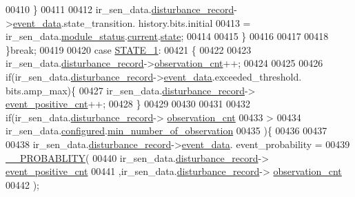 \begin{DoxyCode}
00410              \}
00411 
00412                  ir\_sen\_data.\hyperlink{a00023_ac9b38e2c1d3f1013a88d33506c754152}{disturbance\_record}->\hyperlink{a00028_a8c0bda69e71ef674e60da47ad0be9ab0}{event\_data}.state\_transition.
      history.bits.initial
00413                 = ir\_sen\_data.\hyperlink{a00023_a5a53c391562b059eb744ac679f3765ca}{module\_status}.\hyperlink{a00017_ab8af48cdbba92b3ae39c4470e53af944}{current}.\hyperlink{a00017_a6b8d8e916bc56265a3fd279bd26b6d1b}{state};
00414 
00415             \}
00416 
00417 
00418         \}\textcolor{keywordflow}{break};
00419 
00420          \textcolor{keywordflow}{case} \hyperlink{a00021_a727351838367f27ac0adb9a13422c342}{STATE\_1}:
00421         \{
00422 
00423             ir\_sen\_data.\hyperlink{a00023_ac9b38e2c1d3f1013a88d33506c754152}{disturbance\_record}->\hyperlink{a00028_ad5b0bac02ce266b91b2b52a1c3ea1d78}{observation\_cnt}++;
00424 
00425 
00426            \textcolor{keywordflow}{if}(ir\_sen\_data.\hyperlink{a00023_ac9b38e2c1d3f1013a88d33506c754152}{disturbance\_record}->\hyperlink{a00028_a8c0bda69e71ef674e60da47ad0be9ab0}{event\_data}.exceeded\_threshold.
      bits.amp\_max)\{
00427                  ir\_sen\_data.\hyperlink{a00023_ac9b38e2c1d3f1013a88d33506c754152}{disturbance\_record}->
      \hyperlink{a00028_a7397b9d76d4b57500f27bb23d258a18a}{event\_positive\_cnt}++;
00428            \}
00429 
00430 
00431 
00432                \textcolor{keywordflow}{if}(ir\_sen\_data.\hyperlink{a00023_ac9b38e2c1d3f1013a88d33506c754152}{disturbance\_record}->
      \hyperlink{a00028_ad5b0bac02ce266b91b2b52a1c3ea1d78}{observation\_cnt}
00433                 >
00434                 ir\_sen\_data.\hyperlink{a00023_a94b2d1f6ea4ab334c74d24984dd27843}{configured}.\hyperlink{a00021_ae8665e8bf422c1482442d6949ba28408}{min\_number\_of\_observation}
00435                )\{
00436 
00437 
00438                     ir\_sen\_data.\hyperlink{a00023_ac9b38e2c1d3f1013a88d33506c754152}{disturbance\_record}->\hyperlink{a00028_a8c0bda69e71ef674e60da47ad0be9ab0}{event\_data}.
      event\_probability =
00439                        \hyperlink{a00021_ab2185512402ea26115af112ce48175b2}{\_\_PROBABLITY}(
00440                            ir\_sen\_data.\hyperlink{a00023_ac9b38e2c1d3f1013a88d33506c754152}{disturbance\_record}->
      \hyperlink{a00028_a7397b9d76d4b57500f27bb23d258a18a}{event\_positive\_cnt}
00441                           ,ir\_sen\_data.\hyperlink{a00023_ac9b38e2c1d3f1013a88d33506c754152}{disturbance\_record}->
      \hyperlink{a00028_ad5b0bac02ce266b91b2b52a1c3ea1d78}{observation\_cnt}
00442                            );

\end{DoxyCode}
